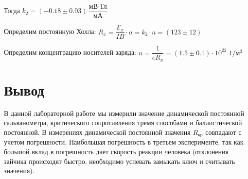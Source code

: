 \documentclass[a4paper, 12pt]{article}
\begin{document}
Тогда  $k_2	 = (-0.18 \pm 0.03) \dfrac{\text{мВ} \cdot \text{Тл}}{\text{мА}}$

Определим постоянную Холла: $R_x = \dfrac{\mathscr{E}_x}{IB} \cdot a = k_2 \cdot a = (123 \pm 12) \; \text{}$

Определим концентрацию носителей заряда: $n = \dfrac{1}{eR_x} = (1.5 \pm 0.1) \cdot 10^{22} \; 1/\text{м}^3$
	
	

\section{Вывод}

В данной лабораторной работе мы измерили значение динамической постоянной гальванометра, критического сопротивления тремя способами и баллистической постоянной. В измерениях динамической постоянной значения $R_\text{кр}$ совпадают с учетом погрешности. Наибольшая погрешность в третьем эксперименте, так как большой вклад в погрешность дает скорость реакции человека (отклонения зайчика происходят быстро, необходимо успевать замыкать ключ и считывать значения).
\end{document}
